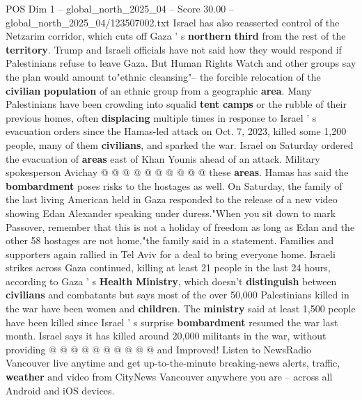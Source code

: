 \begin{textsample}{POS Dim 1 – global\_north\_2025\_04 – Score 30.00 – global\_north\_2025\_04/123507002.txt}
Israel has also reasserted control of the Netzarim corridor, which cuts off Gaza ' s \textbf{northern} \textbf{third} from the rest of the \textbf{territory}.
Trump and Israeli officials have not said how they would respond if Palestinians refuse to leave Gaza.
But Human Rights Watch and other groups say the plan would amount to"ethnic cleansing"-- the forcible relocation of the \textbf{civilian} \textbf{population} of an ethnic group from a geographic \textbf{area}.
Many Palestinians have been crowding into squalid \textbf{tent} \textbf{camps} or the rubble of their previous homes, often \textbf{displacing} multiple times in response to Israel ' s evacuation orders since the Hamas-led attack on Oct. 7, 2023, killed some 1,200 people, many of them \textbf{civilians}, and sparked the war.
Israel on Saturday ordered the evacuation of \textbf{areas} east of Khan Younis ahead of an attack.
Military spokesperson Avichay @ @ @ @ @ @ @ @ @ @ these \textbf{areas}.
Hamas has said the \textbf{bombardment} poses risks to the hostages as well.
On Saturday, the family of the last living American held in Gaza responded to the release of a new video showing Edan Alexander speaking under duress."When you sit down to mark Passover, remember that this is not a holiday of freedom as long as Edan and the other 58 hostages are not home,"the family said in a statement.
Families and supporters again rallied in Tel Aviv for a deal to bring everyone home.
Israeli strikes across Gaza continued, killing at least 21 people in the last 24 hours, according to Gaza ' s \textbf{Health} \textbf{Ministry}, which doesn't \textbf{distinguish} between \textbf{civilians} and combatants but says most of the over 50,000 Palestinians killed in the war have been women and \textbf{children}.
The \textbf{ministry} said at least 1,500 people have been killed since Israel ' s surprise \textbf{bombardment} resumed the war last month.
Israel says it has killed around 20,000 militants in the war, without providing @ @ @ @ @ @ @ @ @ @ and Improved!
Listen to NewsRadio Vancouver live anytime and get up-to-the-minute breaking-news alerts, traffic, \textbf{weather} and video from CityNews Vancouver anywhere you are -- across all Android and iOS devices.

\end{textsample}
